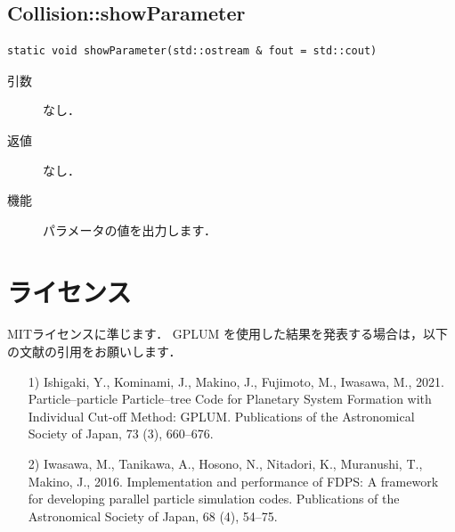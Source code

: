 \documentclass[12pt,a4paper,dvipdfmx]{jsarticle}
\newcommand{\ourcode}{GPLUM\xspace}
\begin{document}
\subsection{Collision::showParameter}

\begin{screen}
\begin{verbatim}
static void showParameter(std::ostream & fout = std::cout)
\end{verbatim}
\end{screen}

\begin{description}
\item[引数]

なし．

\item[返値]

なし．
\item[機能]

パラメータの値を出力します．

\end{description}



\section{ライセンス}

MITライセンスに準じます．
\ourcode を使用した結果を発表する場合は，以下の文献の引用をお願いします．

\begin{itemize}
\item[1)]
Ishigaki, Y., Kominami, J., Makino, J., Fujimoto, M., Iwasawa, M., 2021. 
Particle--particle Particle--tree Code for Planetary System Formation with Individual Cut-off Method: GPLUM. Publications of the Astronomical Society of Japan, 73 (3), 660--676.

\item[2)]
Iwasawa, M., Tanikawa, A., Hosono, N., Nitadori, K., Muranushi, T., Makino, J., 2016. Implementation and performance of FDPS: A framework for developing parallel particle simulation codes. Publications of the Astronomical Society of Japan, 68 (4), 54--75.
\end{itemize}
\end{document}
